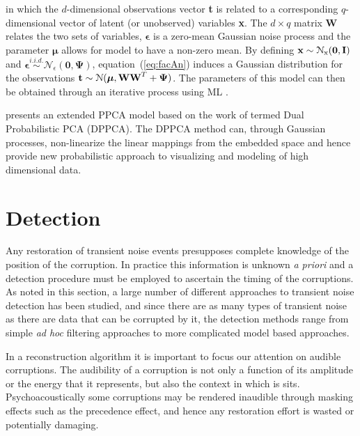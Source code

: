 in which the $d$-dimensional observations vector \textbf{t} is related to a corresponding $q$-dimensional vector of latent (or unobserved) variables \textbf{x}. The $d \times q$ matrix \textbf{W} relates the two sets of variables, $\boldsymbol\epsilon$ is a zero-mean Gaussian noise process and the parameter $\boldsymbol\mu$ allows for model to have a non-zero mean. By defining $\textrm{\textbf{x}} \sim \mathcal{N}_\textrm{x}(\boldsymbol0,\textrm{\textbf{I}})$ and $\boldsymbol\epsilon \stackrel{i.i.d.}{\sim} \mathcal{N}_\epsilon(\boldsymbol0,\boldsymbol\Psi)$, equation~(\ref{eq:facAn}) induces a Gaussian distribution for the observations $\textrm{\textbf{t}} \sim \mathcal{N}(\boldsymbol\mu,\textrm{\textbf{W}}\textrm{\textbf{W}}^T + \boldsymbol\Psi)$. The parameters of this model can then be obtained through an iterative process using ML \citep{Tipping1999}.

\cite{Lawrence2005} presents an extended PPCA model based on the work of \cite{Tipping1999} termed Dual Probabilistic PCA (DPPCA). The DPPCA method can, through Gaussian processes, non-linearize the linear mappings from the embedded space and hence provide new probabilistic approach to visualizing and modeling of high dimensional data.



\section{Detection}\label{sec:LitRev_Detection}
Any restoration of transient noise events presupposes complete knowledge of the position of the corruption. In practice this information is unknown \emph{a priori} and a detection procedure must be employed to ascertain the timing of the corruptions. As noted in this section, a large number of different approaches to transient noise detection has been studied, and since there are as many types of transient noise as there are data that can be corrupted by it, the detection methods range from simple \emph{ad hoc} filtering approaches to more complicated model based approaches.

In a reconstruction algorithm it is important to focus our attention on audible corruptions. The audibility of a corruption is not only a function of its amplitude or the energy that it represents, but also the context in which is sits. Psychoacoustically some corruptions may be rendered inaudible through masking effects such as the precedence effect, and hence any restoration effort is wasted or potentially damaging\cite{Moore2003}.

